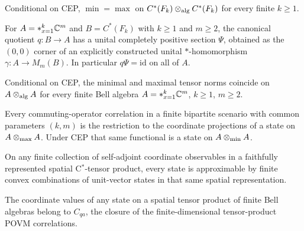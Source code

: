 \begin{lemma}
\label{lem:cep-free-group}
Conditional on CEP, $\min = \max$ on
$C^*(F_k) \otimes_{\mathrm{alg}} C^*(F_k)$ for every finite $k \geq 1$.
\end{lemma}

\begin{lemma}
\label{lem:bell-algebra-section}
For $A = \ast_{x=1}^{k} \mathbb{C}^m$ and $B = C^*(F_k)$ with $k \geq 1$ and $m \geq 2$, the
canonical quotient $q : B \to A$ has a unital completely positive section $\Psi$, obtained as
the $(0,0)$ corner of an explicitly constructed unital $*$-homomorphism
$\gamma : A \to M_m(B)$. In particular $q \Psi = \mathrm{id}$ on all of $A$.
\end{lemma}

\begin{lemma}
\label{lem:cep-bell-algebra}
Conditional on CEP, the minimal and maximal tensor norms coincide on
$A \otimes_{\mathrm{alg}} A$ for every finite Bell algebra $A = \ast_{x=1}^{k} \mathbb{C}^m$,
$k \geq 1$, $m \geq 2$.
\end{lemma}

\begin{lemma}
\label{lem:commuting-restricts-state}
Every commuting-operator correlation in a finite bipartite scenario with common parameters
$(k,m)$ is the restriction to the coordinate projections of a state on
$A \otimes_{\max} A$. Under CEP that same functional is a state on $A \otimes_{\min} A$.
\end{lemma}

\begin{lemma}
\label{lem:spatial-coordinates}
On any finite collection of self-adjoint coordinate observables in a faithfully represented
spatial C$^*$-tensor product, every state is approximable by finite convex combinations of
unit-vector states in that same spatial representation.
\end{lemma}

\begin{lemma}
\label{lem:spatial-values-cqa}
The coordinate values of any state on a spatial tensor product of finite Bell algebras belong
to $C_{qa}$, the closure of the finite-dimensional tensor-product POVM correlations.
\end{lemma}

